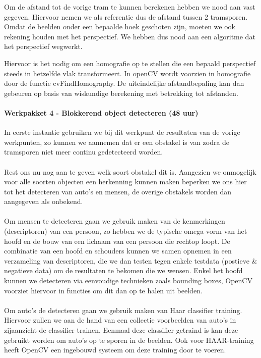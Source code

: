\documentclass[a4paper,oneside,11pt,final]{memoir}
\begin{document}
Om de afstand tot de vorige tram te kunnen berekenen hebben we nood aan vast gegeven. Hiervoor nemen we als referentie dus de afstand tussen 2 tramsporen. Omdat de beelden onder een bepaalde hoek geschoten zijn, moeten we ook rekening houden met het perspectief. We hebben dus nood aan een algoritme dat het perspectief wegwerkt.

Hiervoor is het nodig om een homografie op te stellen die een bepaald perspectief steeds in hetzelfde vlak transformeert. In openCV wordt voorzien in homografie door de functie cvFindHomography. De uiteindelijke afstandbepaling kan dan gebeuren op basis van wiskundige berekening met betrekking tot afstanden.

\paragraph{Werkpakket 4 - Blokkerend object detecteren (48 uur)}

In eerste instantie gebruiken we bij dit werkpunt de resultaten van de vorige werkpunten, zo kunnen we aannemen dat er een obstakel is van zodra de tramsporen niet meer continu gedetecteerd worden.
\\\\
Rest ons nu nog aan te geven welk soort obstakel dit is. Aangezien we onmogelijk voor alle soorten objecten een herkenning kunnen maken beperken we ons hier tot het detecteren van auto's en mensen, de overige obstakels worden dan aangegeven als onbekend.
\\\\
Om mensen te detecteren gaan we gebruik maken van de kenmerkingen (descriptoren) van een persoon, zo hebben we de typische omega-vorm van het hoofd en de  bouw van een lichaam van een persoon die rechtop loopt. De combinatie van een hoofd en schouders kunnen we samen opnemen in een verzameling van descriptoren, die we dan testen tegen enkele testdata (postieve \& negatieve data) om de resultaten te bekomen die we wensen. Enkel het hoofd kunnen we detecteren via eenvoudige technieken zoals bounding boxes, OpenCV voorziet hiervoor in functies om dit dan op te halen uit beelden.
\\\\
Om auto's de detecteren gaan we gebruik maken van Haar classifier training. Hiervoor zullen we aan de hand van een collectie voorbeelden van auto's in zijaanzicht de classifier trainen. Eenmaal deze classifier getraind is kan deze gebruikt worden om auto's op te sporen in de beelden. Ook voor HAAR-training heeft OpenCV een ingebouwd systeem om deze training door te voeren.
\end{document}
